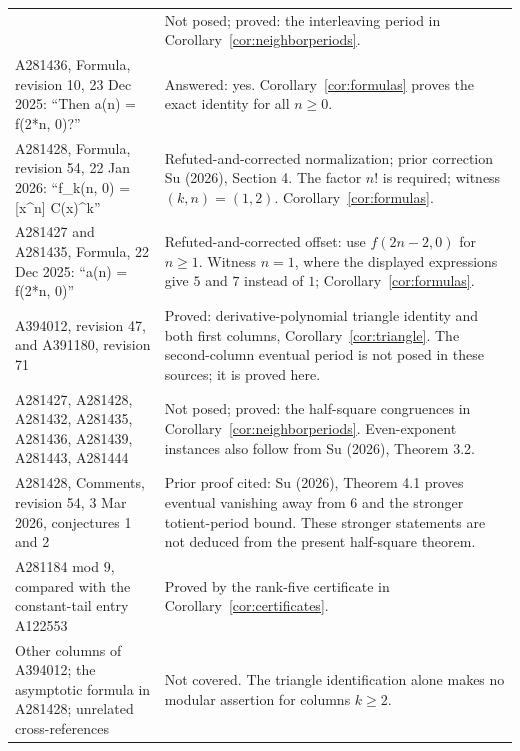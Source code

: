 \documentclass[11pt]{article}
\begin{document}
{\begin{longtable}{@{}p{.30\linewidth}p{.65\linewidth}@{}}
 & Not posed; proved: the interleaving period in
 Corollary~\ref{cor:neighborperiods}.\\
A281436, Formula, revision 10, 23 Dec 2025: ``Then a(n) = f(2*n, 0)?''
 & Answered: yes. Corollary~\ref{cor:formulas} proves the exact
 identity for all $n\ge0$.\\
A281428, Formula, revision 54, 22 Jan 2026: ``f\_k(n, 0) = [x\^{}n] C(x)\^{}k''
 & Refuted-and-corrected normalization; prior correction Su (2026),
 Section 4. The factor $n!$ is required; witness $(k,n)=(1,2)$.
 Corollary~\ref{cor:formulas}.\\
A281427 and A281435, Formula, 22 Dec 2025: ``a(n) = f(2*n, 0)''
 & Refuted-and-corrected offset: use $f(2n-2,0)$ for $n\ge1$.
 Witness $n=1$, where the displayed expressions give $5$ and $7$
 instead of $1$; Corollary~\ref{cor:formulas}.\\
A394012, revision 47, and A391180, revision 71
 & Proved: derivative-polynomial triangle identity and both first
 columns, Corollary~\ref{cor:triangle}. The second-column eventual period
 is not posed in these sources; it is proved here.\\
A281427, A281428, A281432, A281435, A281436, A281439, A281443, A281444
 & Not posed; proved: the half-square congruences in
 Corollary~\ref{cor:neighborperiods}. Even-exponent instances also follow
 from Su (2026), Theorem 3.2.\\
A281428, Comments, revision 54, 3 Mar 2026, conjectures 1 and 2
 & Prior proof cited: Su (2026), Theorem 4.1 proves eventual
 vanishing away from $6$ and the stronger totient-period bound.
 These stronger statements are not deduced from the present half-square theorem.\\
A281184 mod $9$, compared with the constant-tail entry A122553
 & Proved by the rank-five certificate in Corollary~\ref{cor:certificates}.\\
Other columns of A394012; the asymptotic formula in A281428;
unrelated cross-references
 & Not covered. The triangle identification alone makes no modular
 assertion for columns $k\ge2$.\\
\end{longtable}}
\end{document}
